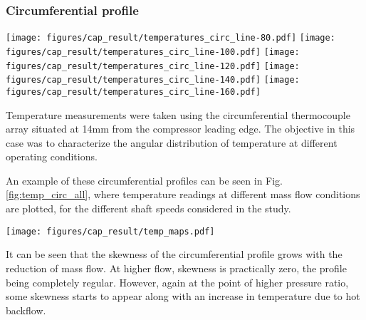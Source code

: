 \subsubsection{Circumferential profile}

\begin{figure*}[htb!]
\centering
\texttt{[image: figures/cap\_result/temperatures\_circ\_line-80.pdf]}
\texttt{[image: figures/cap\_result/temperatures\_circ\_line-100.pdf]}
\texttt{[image: figures/cap\_result/temperatures\_circ\_line-120.pdf]}
\texttt{[image: figures/cap\_result/temperatures\_circ\_line-140.pdf]}
\texttt{[image: figures/cap\_result/temperatures\_circ\_line-160.pdf]}
\caption{Evolution of temperature measured by the circumferential array thermocouples as air mass flow was reduced keeping shaft speed constant. A polar temperature plot is shown for each speed, colors indicating mass flow from higher (blues) to lower (reds). Legends for colors at each speed are available in Fig. \ref{fig:temp_line_linear}. See Fig. \ref{fig:metod_local_meas_dimen} for reference position of the compressor volute.}
\label{fig:temp_circ_all}
\end{figure*}

Temperature measurements were taken using the circumferential thermocouple array situated at 14mm from the compressor leading edge. The objective in this case was to characterize the angular distribution of temperature at different operating conditions.

An example of these circumferential profiles can be seen in Fig. \ref{fig:temp_circ_all}, where temperature readings at different mass flow conditions are plotted, for the different shaft speeds considered in the study. 

\begin{figure*}[htb!]
\centering
\texttt{[image: figures/cap\_result/temp\_maps.pdf]}
\caption{\hl{Evolution of temperature rise measured by the linear array thermocouples for different mass flow settings at 140 krpm, taking the most upstream temperature as reference.}}
\label{fig:temp_maps}
\end{figure*}

It can be seen that the skewness of the circumferential profile grows with the reduction of mass flow. At higher flow, skewness is practically zero, the profile being completely regular. However, again at the point of higher pressure ratio, some skewness starts to appear along with an increase in temperature due to hot backflow.

